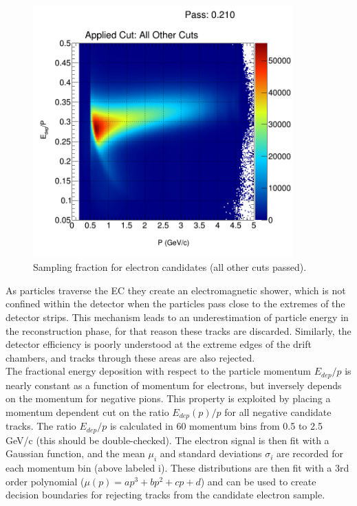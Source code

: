 \begin{figure}
  \label{fig:sampling_fraction}
  \begin{center}
    \includegraphics[width=10cm]{image/h_etot_p_allOthers_all.png}
    \caption{Sampling fraction for electron candidates (all other cuts passed).}
  \end{center}
\end{figure}

As particles traverse the EC they create an electromagnetic shower, which is not confined within the detector when the particles pass close to the extremes of the detector strips.  This mechanism leads to an underestimation of particle energy in the reconstruction phase, for that reason these tracks are discarded.  Similarly, the detector efficiency is poorly understood at the extreme edges of the drift chambers, and tracks through these areas are also rejected.  \\

The fractional energy deposition with respect to the particle momentum $E_{dep}/p$ is nearly constant as a function of momentum for electrons, but inversely depends on the momentum for negative pions.  This property is exploited by placing a momentum dependent cut on the ratio $E_{dep}(p)/p$ for all negative candidate tracks.  The ratio $E_{dep}/p$ is calculated in 60 momentum bins from 0.5 to 2.5 GeV/c (this should be double-checked).  The electron signal is then fit with a Gaussian function, and the mean $\mu_i$ and standard deviations $\sigma_i$ are recorded for each momentum bin (above labeled i).  These distributions are then fit with a 3rd order polynomial ($\mu(p) = ap^3 + bp^2 + cp + d$) and can be used to create decision boundaries for rejecting tracks from the candidate electron sample.  
\\

